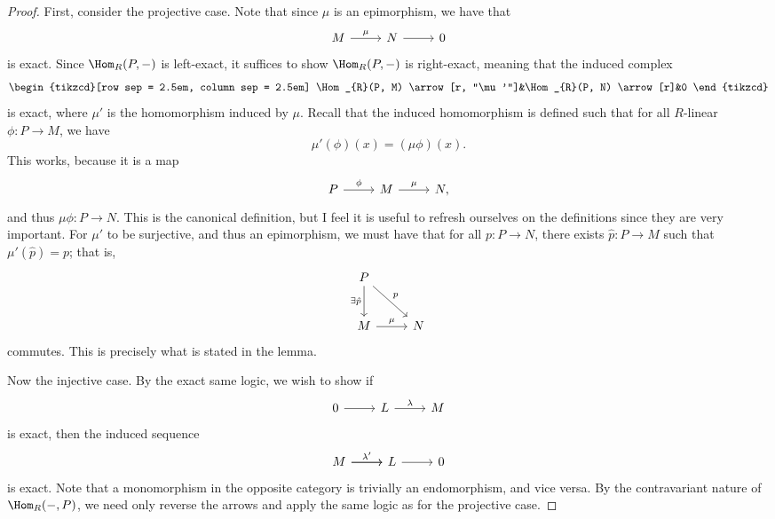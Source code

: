 \begin{proof}
	First, consider the projective case. Note that since $\mu $ is an epimorphism, we have that
	\[\begin{tikzcd}[row sep = 2.5em, column sep = 2.5em]
		M\arrow[r, "\mu "]&N\arrow[r]&0
	\end{tikzcd}\]
	is exact. Since $\Hom_{R}(P, -) $ is left-exact, it suffices to show $\Hom_{R}(P, -) $ is right-exact, meaning that the induced complex
	\[\begin{tikzcd}[row sep = 2.5em, column sep = 2.5em]
		\Hom_{R}(P, M) \arrow[r, "\mu '"]&\Hom_{R}(P, N) \arrow[r]&0
	\end{tikzcd}\]
	is exact, where $\mu '$ is the homomorphism induced by $\mu $. Recall that the induced homomorphism is defined such that for all $R$-linear $\phi : P \to M$, we have
	\[
		\mu '(\phi )(x)=(\mu \phi )(x)
	.\]
	This works, because it is a map
	\[\begin{tikzcd}[row sep = 2.5em, column sep = 2.5em]
		P\arrow[r, "\phi "]&M\arrow[r, "\mu "]&N,
	\end{tikzcd}\]
	and thus $\mu \phi : P \to N$. This is the canonical definition, but I feel it is useful to refresh ourselves on the definitions since they are very important. For $\mu '$ to be surjective, and thus an epimorphism, we must have that for all $p : P \to N$, there exists $\hat{p} : P \to M$ such that $\mu '( \hat{p} )=p$; that is,
	\[\begin{tikzcd}[row sep = 2.5em, column sep = 2.5em]
		P\arrow[dr, "p"]\arrow[d, " \exists \hat{p} "']\\
		M\arrow[r, "\mu "]&N
	\end{tikzcd}\]
	commutes. This is precisely what is stated in the lemma.

	Now the injective case. By the exact same logic, we wish to show if
	\[\begin{tikzcd}[row sep = 2.5em, column sep = 2.5em]
		0\arrow[r]&L\arrow[r, "\lambda "]&M
	\end{tikzcd}\]
	is exact, then the induced sequence
	\[\begin{tikzcd}[row sep = 2.5em, column sep = 2.5em]
		M\arrow[r, "\lambda '"]\arrow[r]&L\arrow[r]&0
	\end{tikzcd}\]
	is exact. Note that a monomorphism in the opposite category is trivially an endomorphism, and vice versa. By the contravariant nature of $\Hom_{R}(-, P) $, we need only reverse the arrows and apply the same logic as for the projective case.
\end{proof}

